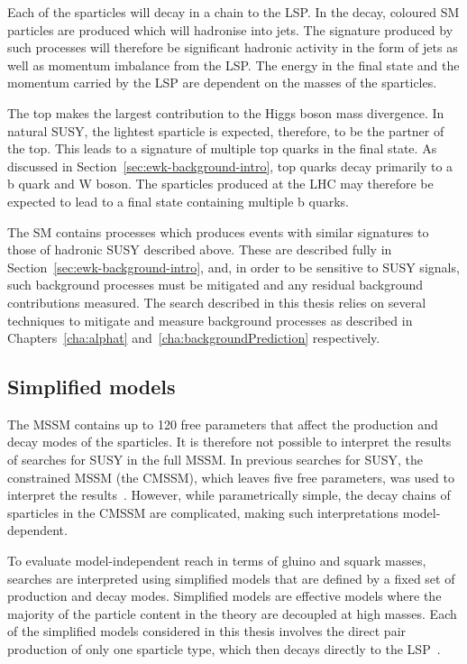 Each of the sparticles will decay in a chain to the LSP. In the decay, 
coloured SM particles are produced which will hadronise into jets.
The signature produced by such processes will therefore be significant hadronic activity in 
the form of jets as well as momentum imbalance from the LSP. The energy in
the final state and the momentum carried by the LSP are dependent on the masses
of the sparticles.

The top makes the largest contribution to the Higgs boson mass divergence. In natural SUSY, 
the lightest sparticle is expected, therefore, to be the partner of the top. This leads to a signature
of multiple top quarks in the final state. As discussed in Section~\ref{sec:ewk-background-intro}, top quarks
decay primarily to a b quark and W boson. The sparticles produced at the LHC 
may therefore be expected to lead to a final state containing multiple b quarks.

The SM contains processes which produces events with similar signatures to 
those of hadronic SUSY described above. These are described fully in Section~\ref{sec:ewk-background-intro},
and, in order to be sensitive to SUSY signals, such background processes must be mitigated 
and any residual background contributions measured. The search described in this thesis relies on several
techniques to mitigate and measure background processes as described in Chapters~\ref{cha:alphat} and~\ref{cha:backgroundPrediction}
respectively.

\subsection{Simplified models}

The MSSM contains up to 120 free parameters that affect the production and decay modes of the sparticles.
It is therefore not possible to interpret the results of searches for SUSY in the full MSSM. 
In previous searches for SUSY, the constrained MSSM (the CMSSM), which leaves five free parameters, was 
used to interpret the results~\cite{CMSSM}. However, while parametrically simple, the decay chains of sparticles 
in the CMSSM are complicated, making such interpretations model-dependent. 

To evaluate model-independent reach in terms of gluino and squark masses, searches are interpreted using 
simplified models that are defined by a fixed set of production and decay modes.
Simplified models are effective models where the majority of the particle content in the theory 
are decoupled at high masses. Each of the simplified models considered in this thesis involves
the direct pair production of only one sparticle type, which then decays directly to the LSP~\cite{SMS}.

